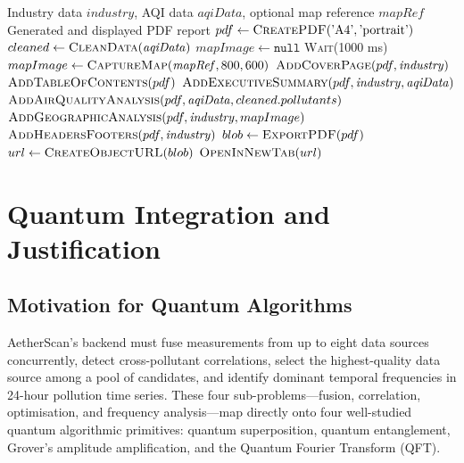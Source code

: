 \documentclass[12pt,a4paper]{article}
\begin{document}
\begin{algorithm}[H]
\caption{Client-Side PDF Export Pipeline}
\label{alg:pdf_export}
\begin{algorithmic}[1]
\Require Industry data $\mathit{industry}$, AQI data $\mathit{aqiData}$, optional map reference $\mathit{mapRef}$
\Ensure Generated and displayed PDF report
\State $pdf \leftarrow \textsc{CreatePDF}(\text{'A4'}, \text{'portrait'})$
\State $cleaned \leftarrow \textsc{CleanData}(\mathit{aqiData})$
\State $mapImage \leftarrow \texttt{null}$
    \State \textsc{Wait}(1000 ms)
    \State $mapImage \leftarrow \textsc{CaptureMap}(\mathit{mapRef}, 800, 600)$
\EndIf
\State $\textsc{AddCoverPage}(pdf, \mathit{industry})$
\State $\textsc{AddTableOfContents}(pdf)$
\State $\textsc{AddExecutiveSummary}(pdf, \mathit{industry}, \mathit{aqiData})$
\State $\textsc{AddAirQualityAnalysis}(pdf, \mathit{aqiData}, cleaned.pollutants)$
\State $\textsc{AddGeographicAnalysis}(pdf, \mathit{industry}, mapImage)$
\State $\textsc{AddHeadersFooters}(pdf, \mathit{industry})$
\State $blob \leftarrow \textsc{ExportPDF}(pdf)$
\State $url \leftarrow \textsc{CreateObjectURL}(blob)$
\State $\textsc{OpenInNewTab}(url)$
\end{algorithmic}
\end{algorithm}
\clearpage
\section{Quantum Integration and Justification}
\label{sec:quantum}

\subsection{Motivation for Quantum Algorithms}
\label{sec:quantum:motivation}

AetherScan's backend must fuse measurements from up to eight data sources
concurrently, detect cross-pollutant correlations, select the highest-quality
data source among a pool of candidates, and identify dominant temporal
frequencies in 24-hour pollution time series. These four sub-problems---fusion,
correlation, optimisation, and frequency analysis---map directly onto four
well-studied quantum algorithmic primitives: quantum superposition, quantum
entanglement, Grover's amplitude amplification, and the Quantum Fourier
Transform (QFT).
\end{document}
